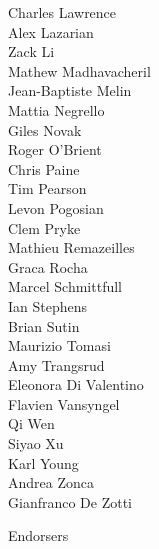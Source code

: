 \documentclass[PICOReport.tex]{subfiles}
\begin{document}
{\begin{multicols}{4}
Charles Lawrence    \\
Alex Lazarian    \\
Zack Li    \\
Mathew Madhavacheril    \\
Jean-Baptiste Melin    \\
Mattia Negrello    \\
Giles Novak    \\
Roger O'Brient    \\
Chris Paine    \\
Tim Pearson    \\
Levon Pogosian    \\
Clem Pryke    \\
Mathieu Remazeilles    \\
Graca Rocha    \\
Marcel Schmittfull    \\
Ian Stephens    \\
Brian Sutin    \\
Maurizio Tomasi    \\
Amy Trangsrud    \\
Eleonora Di Valentino    \\
Flavien Vansyngel    \\
Qi Wen    \\
Siyao Xu    \\
Karl Young    \\
Andrea Zonca    \\
Gianfranco De Zotti    
\end{multicols}
}

\Large { \centerline {Endorsers}}
\end{document}
